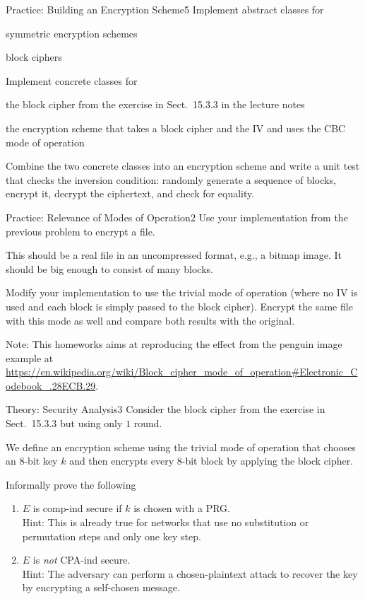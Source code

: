 \documentclass[a4paper]{article}
\begin{document}
\header

\begin{problem}{Practice: Building an Encryption Scheme}{5}
Implement abstract classes for
\begin{compactitem}
 \item symmetric encryption schemes
 \item block ciphers
\end{compactitem}

Implement concrete classes for
\begin{compactitem}
 \item the block cipher from the exercise in Sect.~15.3.3 in the lecture notes
 \item the encryption scheme that takes a block cipher and the IV and uses the CBC mode of operation
\end{compactitem}

Combine the two concrete classes into an encryption scheme and write a unit test that checks the inversion condition: randomly generate a sequence of blocks, encrypt it, decrypt the ciphertext, and check for equality.
\end{problem}

\begin{problem}{Practice: Relevance of Modes of Operation}{2}
Use your implementation from the previous problem to encrypt a file.

This should be a real file in an uncompressed format, e.g., a bitmap image.
It should be big enough to consist of many blocks.

Modify your implementation to use the trivial mode of operation (where no IV is used and each block is simply passed to the block cipher).
Encrypt the same file with this mode as well and compare both results with the original.

Note: This homeworks aims at reproducing the effect from the penguin image example at \url{https://en.wikipedia.org/wiki/Block_cipher_mode_of_operation#Electronic_Codebook_.28ECB.29}.
\end{problem}

\begin{problem}{Theory: Security Analysis}{3}
Consider the block cipher from the exercise in Sect.~15.3.3 but using only $1$ round.

We define an encryption scheme using the trivial mode of operation that chooses an $8$-bit key $k$ and then encrypts every $8$-bit block by applying the block cipher.

Informally prove the following
\begin{enumerate}
  \item $E$ is comp-ind secure if $k$ is chosen with a PRG.\\
    Hint: This is already true for networks that use no substitution or permutation steps and only one key step.
  \item $E$ is \emph{not} CPA-ind secure.\\
   Hint: The adversary can perform a chosen-plaintext attack to recover the key by encrypting a self-chosen message.
\end{enumerate}
\end{problem}
\end{document}
